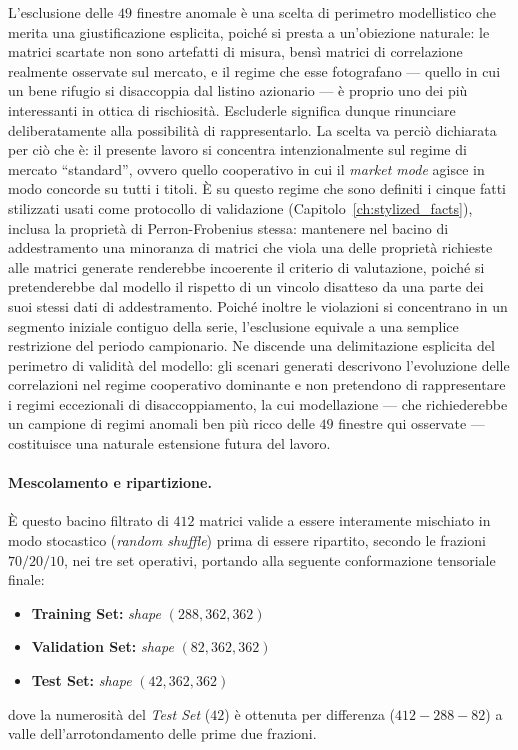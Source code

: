\begin{osservazione}
L'esclusione delle $49$ finestre anomale è una scelta di perimetro modellistico che merita una giustificazione esplicita, poiché si presta a un'obiezione naturale: le matrici scartate non sono artefatti di misura, bensì matrici di correlazione realmente osservate sul mercato, e il regime che esse fotografano --- quello in cui un bene rifugio si disaccoppia dal listino azionario --- è proprio uno dei più interessanti in ottica di rischiosità. Escluderle significa dunque rinunciare deliberatamente alla possibilità di rappresentarlo. La scelta va perciò dichiarata per ciò che è: il presente lavoro si concentra intenzionalmente sul regime di mercato ``standard'', ovvero quello cooperativo in cui il \emph{market mode} agisce in modo concorde su tutti i titoli. È su questo regime che sono definiti i cinque fatti stilizzati usati come protocollo di validazione (Capitolo~\ref{ch:stylized_facts}), inclusa la proprietà di Perron-Frobenius stessa: mantenere nel bacino di addestramento una minoranza di matrici che viola una delle proprietà richieste alle matrici generate renderebbe incoerente il criterio di valutazione, poiché si pretenderebbe dal modello il rispetto di un vincolo disatteso da una parte dei suoi stessi dati di addestramento. Poiché inoltre le violazioni si concentrano in un segmento iniziale contiguo della serie, l'esclusione equivale a una semplice restrizione del periodo campionario. Ne discende una delimitazione esplicita del perimetro di validità del modello: gli scenari generati descrivono l'evoluzione delle correlazioni nel regime cooperativo dominante e non pretendono di rappresentare i regimi eccezionali di disaccoppiamento, la cui modellazione --- che richiederebbe un campione di regimi anomali ben più ricco delle $49$ finestre qui osservate --- costituisce una naturale estensione futura del lavoro.
\end{osservazione}

\paragraph{Mescolamento e ripartizione.} È questo bacino filtrato di $412$ matrici valide a essere interamente mischiato in modo stocastico (\emph{random shuffle}) prima di essere ripartito, secondo le frazioni $70/20/10$, nei tre set operativi, portando alla seguente conformazione tensoriale finale:
\begin{itemize}
    \item \textbf{Training Set:} \emph{shape} $(288, 362, 362)$
    \item \textbf{Validation Set:} \emph{shape} $(82, 362, 362)$
    \item \textbf{Test Set:} \emph{shape} $(42, 362, 362)$
\end{itemize}
dove la numerosità del \emph{Test Set} ($42$) è ottenuta per differenza ($412 - 288 - 82$) a valle dell'arrotondamento delle prime due frazioni.

